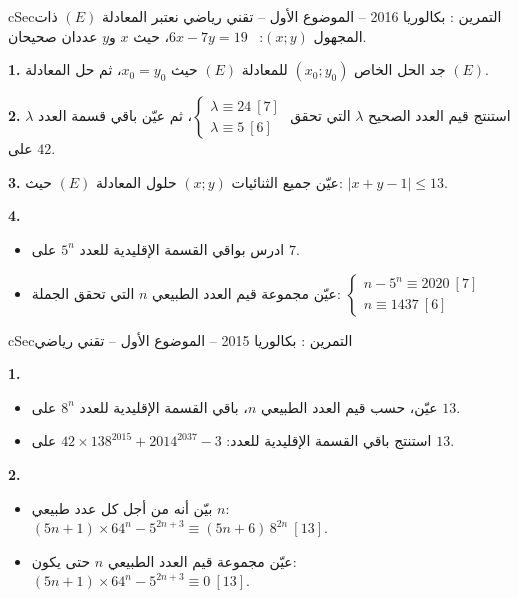 \documentclass[12pt,a4paper]{article}
\newenvironment{BOX}[2]{\begin{otherlanguage}{english}\begin{arbox}{#1}{#2}}{\end{arbox}\end{otherlanguage}}
\newcounter{exo}
\newenvironment{tamrin}[1]{\stepcounter{exo}\begin{BOX}{cSec}{التمرين \theexo: #1}}{\end{BOX}}
\newenvironment{sq}{\begin{itemize}[leftmargin=2.4em,itemsep=3pt]}{\end{itemize}}
\newcommand{\qa}{\item[(أ)]}\newcommand{\qb}{\item[(ب)]}\newcommand{\qc}{\item[(جـ)]}\newcommand{\qd}{\item[(د)]}\newcommand{\qe}{\item[(هـ)]}
\newcommand{\QQ}[1]{\par\smallskip\textbf{#1.} }
\begin{document}
\begin{tamrin}{بكالوريا 2016 -- الموضوع الأول -- تقني رياضي}
نعتبر المعادلة $(E)$ ذات المجهول $(x;y)$: \ $6x-7y=19$، حيث $x$ و$y$ عددان صحيحان.
\QQ{1} جد الحل الخاص $(x_0;y_0)$ للمعادلة $(E)$ حيث $x_0=y_0$، ثم حل المعادلة $(E)$.
\QQ{2} استنتج قيم العدد الصحيح $\lambda$ التي تحقق $\begin{cases}\lambda\equiv 24\ [7]\\ \lambda\equiv 5\ [6]\end{cases}$، ثم عيّن باقي قسمة العدد $\lambda$ على $42$.
\QQ{3} عيّن جميع الثنائيات $(x;y)$ حلول المعادلة $(E)$ حيث: $|x+y-1|\le 13$.
\QQ{4}
\begin{sq}
\qa ادرس بواقي القسمة الإقليدية للعدد $5^n$ على $7$.
\qb عيّن مجموعة قيم العدد الطبيعي $n$ التي تحقق الجملة: $\begin{cases}n-5^n\equiv 2020\ [7]\\ n\equiv 1437\ [6]\end{cases}$
\end{sq}
\end{tamrin}

\begin{tamrin}{بكالوريا 2015 -- الموضوع الأول -- تقني رياضي}
\QQ{1}
\begin{sq}
\qa عيّن، حسب قيم العدد الطبيعي $n$، باقي القسمة الإقليدية للعدد $8^n$ على $13$.
\qb استنتج باقي القسمة الإقليدية للعدد: $42\times 138^{2015}+2014^{2037}-3$ على $13$.
\end{sq}
\QQ{2}
\begin{sq}
\qa بيّن أنه من أجل كل عدد طبيعي $n$: $(5n+1)\times 64^n-5^{2n+3}\equiv (5n+6)\,8^{2n}\ [13]$.
\qb عيّن مجموعة قيم العدد الطبيعي $n$ حتى يكون: $(5n+1)\times 64^n-5^{2n+3}\equiv 0\ [13]$.
\end{sq}
\end{tamrin}
\end{document}
